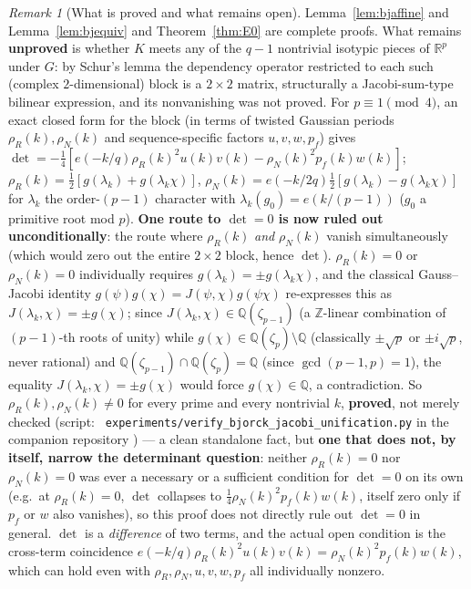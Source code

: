 \documentclass[11pt]{article}
\theoremstyle{plain}
\theoremstyle{definition}
\theoremstyle{remark}
\newtheorem{remark}[theorem]{Remark}
\newcommand{\R}{\mathbb R}
\newcommand{\Z}{\mathbb Z}
\newcommand{\Q}{\mathbb Q}
\begin{document}
\begin{remark}[What is proved and what remains open]
Lemma~\ref{lem:bjaffine} and Lemma~\ref{lem:bjequiv} and
Theorem~\ref{thm:E0} are complete proofs. What remains \textbf{unproved} is
whether $K$ meets any of the $q-1$ nontrivial isotypic pieces of $\R^p$
under $G$: by Schur's lemma the dependency operator restricted to each
such (complex $2$-dimensional) block is a $2\times2$ matrix, structurally a
Jacobi-sum-type bilinear expression, and its nonvanishing was not proved.
For $p\equiv1\pmod4$, an exact closed form for the block (in terms of
twisted Gaussian periods $\rho_R(k),\rho_N(k)$ and sequence-specific
factors $u,v,w,p_f$) gives $\det=-\tfrac14[e(-k/q)\rho_R(k)^2u(k)v(k)-\rho_N(k)^2p_f(k)w(k)]$;
$\rho_R(k)=\tfrac12[g(\lambda_k)+g(\lambda_k\chi)]$,
$\rho_N(k)=e(-k/2q)\tfrac12[g(\lambda_k)-g(\lambda_k\chi)]$ for
$\lambda_k$ the order-$(p-1)$ character with $\lambda_k(g_0)=e(k/(p-1))$
($g_0$ a primitive root mod $p$). \textbf{One route to $\det=0$ is now
ruled out unconditionally}: the route where $\rho_R(k)$ \emph{and}
$\rho_N(k)$ vanish simultaneously (which would zero out the entire
$2\times2$ block, hence $\det$). $\rho_R(k)=0$ or $\rho_N(k)=0$
individually requires $g(\lambda_k)=\pm g(\lambda_k\chi)$, and the
classical Gauss--Jacobi identity $g(\psi)g(\chi)=J(\psi,\chi)g(\psi\chi)$
re-expresses this as $J(\lambda_k,\chi)=\pm g(\chi)$; since
$J(\lambda_k,\chi)\in\Q(\zeta_{p-1})$ (a $\Z$-linear combination of
$(p-1)$-th roots of unity) while $g(\chi)\in\Q(\zeta_p)\setminus\Q$
(classically $\pm\sqrt p$ or $\pm i\sqrt p$, never rational) and
$\Q(\zeta_{p-1})\cap\Q(\zeta_p)=\Q$ (since $\gcd(p-1,p)=1$), the equality
$J(\lambda_k,\chi)=\pm g(\chi)$ would force $g(\chi)\in\Q$, a
contradiction. So $\rho_R(k),\rho_N(k)\ne0$ for every prime and every
nontrivial $k$, \textbf{proved}, not merely checked (script: {\tt
experiments/verify\_bjorck\_jacobi\_unification.py} in the companion
repository \cite{CazacAlgorithmRepo}) --- a clean standalone fact, but
\textbf{one that does not, by itself, narrow the determinant question}:
neither $\rho_R(k)=0$ nor $\rho_N(k)=0$ was ever a necessary or a
sufficient condition for $\det=0$ on its own (e.g.\ at $\rho_R(k)=0$,
$\det$ collapses to $\tfrac14\rho_N(k)^2p_f(k)w(k)$, itself zero only if
$p_f$ or $w$ also vanishes), so this proof does not directly rule out
$\det=0$ in general. $\det$ is a \emph{difference} of two terms, and the
actual open condition is the cross-term coincidence
$e(-k/q)\rho_R(k)^2u(k)v(k)=\rho_N(k)^2p_f(k)w(k)$, which can hold even
with $\rho_R,\rho_N,u,v,w,p_f$ all individually nonzero.

\end{remark}
\end{document}
